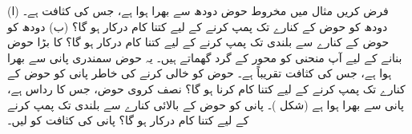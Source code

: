 فرض کریں مثال  میں مخروط حوض دودھ سے بھرا ہوا ہے، جس کی کثافت  ہے۔ (ا) دودھ کو حوض کے کنارے تک پمپ کرنے کے لیے کتنا کام درکار ہو گا؟  (ب) دودھ کو حوض کے کنارے سے  بلندی تک پمپ کرنے کے لیے کتنا کام درکار ہو گا؟
 کا بڑا حوض بنانے کے لیے آپ  منحنی  کو محور  کے گرد گھماتے ہیں۔ یہ حوض سمندری پانی سے بھرا ہوا ہے، جس کی کثافت تقریباً   ہے۔ حوض کو خالی کرنے کی خاطر   پانی کو حوض کے کنارے تک پمپ کرنے کے لیے کتنا کام کرنا ہو گا؟
نصف کروی حوض، جس کا رداس  ہے،  پانی سے بھرا ہوا ہے (شکل )۔ پانی کو حوض کے بالائی کنارے سے  بلندی تک پمپ کرنے کے لیے کتنا کام درکار ہو گا؟ پانی کی کثافت کو  لیں۔
